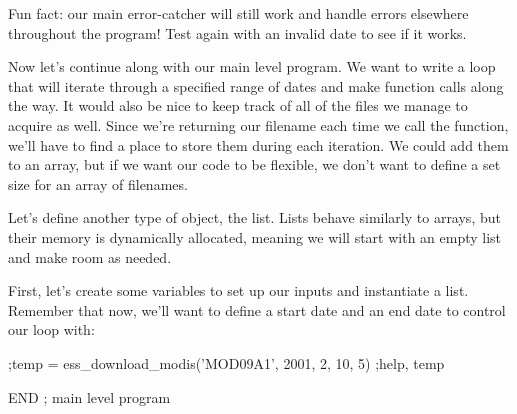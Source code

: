 \documentclass{book}
\newcommand{\codefill}{\centering$\longrightarrow$\hfill{\color{gray}\rule[0.1\baselineskip]{0.5\linewidth}{2pt}}\hfill$\longleftarrow$}
\newcounter{highlight}[page]
\newcommand{\tikzhighlightanchor}[1]{\ensuremath{\vcenter{\hbox{\tikz[remember picture, overlay]{\coordinate (#1 highlight \arabic{highlight});}}}}}
\newcommand{\bh}[0]{\stepcounter{highlight}\tikzhighlightanchor{begin}}
\newcommand{\eh}[0]{\tikzhighlightanchor{end}}
\theoremstyle{aside_style}
\begin{document}

Fun fact: our main error-catcher will still work and handle errors elsewhere throughout the program!
Test again with an invalid date to see if it works.

Now let's continue along with our main level program. 
We want to write a loop that will iterate through a specified range of dates and make function calls along the way.
It would also be nice to keep track of all of the files we manage to acquire as well.
Since we're returning our filename each time we call the function, we'll have to find a place to store them during each iteration.
We could add them to an array, but if we want our code to be flexible, we don't want to define a set size for an array of filenames.

Let's define another type of object, the list. 
Lists behave similarly to arrays, but their memory is dynamically allocated, meaning we will start with an empty list and make room as needed.

First, let's create some variables to set up our inputs and instantiate a list. 
Remember that now, we'll want to define a start date and an end date to control our loop with:

\begin{idl}
;temp = ess_download_modis('MOD09A1', 2001, 2, 10, 5)
;help, temp



END ; main level program
\end{idl}
\end{document}
